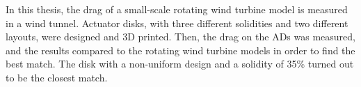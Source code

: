 In this thesis, the drag of a small-scale rotating wind turbine model is measured in a wind tunnel. Actuator disks, with three different solidities and two different layouts, were designed and 3D printed. Then, the drag on the ADs was measured, and the results compared to the rotating wind turbine models in order to find the best match. The disk with a non-uniform design and a solidity of 35\% turned out to be the closest match. 






